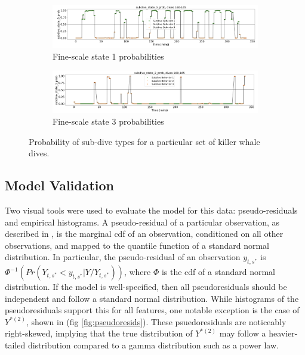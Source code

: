 \begin{figure}[h!]
	\centering
	\begin{subfigure}[t]{1.0\textwidth}
        \centering
        \includegraphics[width=5in]{../Plots/Fine_state_probs_1.png}
        \caption{Fine-scale state 1 probabilities}
    \end{subfigure}
    \newline
    \begin{subfigure}[t]{1.0\textwidth}
        \centering
        \includegraphics[width=5in]{../Plots/Fine_state_probs_3.png}
        \caption{Fine-scale state 3 probabilities}
    \end{subfigure}
	\caption{Probability of sub-dive types for a particular set of killer whale dives.}
	\label{fig:fine_probs}
\end{figure}

\subsection{Model Validation}
\label{model_validation}

Two visual tools were used to evaluate the model for this data: pseudo-residuals and empirical histograms. A pseudo-residual of a particular observation, as described in \cite{Zucchini:2016}, is the marginal cdf of an observation, conditioned on all other observations, and mapped to the quantile function of a standard normal distribution. In particular, the pseudo-residual of an observation $y_{t,s^*}$ is $\Phi^{-1} \left(Pr(Y_{t,s^*} < y_{t,s^*}|Y/Y_{t,s^*}) \right)$, where $\Phi$ is the cdf of a standard normal distribution. If the model is well-specified, then all pseudoresiduals should be independent and follow a standard normal distribution. While histograms of the pseudoresiduals support this for all features, one notable exception is the case of $Y^{*(2)}$, shown in (fig \ref{fig:pseudoresids}). These psuedoresiduals are noticeably right-skewed, implying that the true distribution of $Y^{*(2)}$ may follow a heavier-tailed distribution compared to a gamma distribution such as a power law. 


